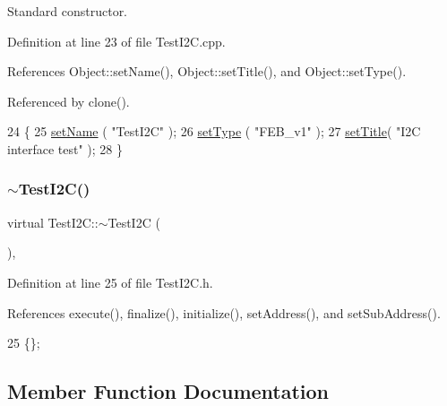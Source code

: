 Standard constructor. 



Definition at line 23 of file Test\+I2\+C.\+cpp.



References Object\+::set\+Name(), Object\+::set\+Title(), and Object\+::set\+Type().



Referenced by clone().


\begin{DoxyCode}
24 \{
25   \hyperlink{classObject_ae30fea75683c2d149b6b6d17c09ecd0c}{setName} ( \textcolor{stringliteral}{"TestI2C"} );
26   \hyperlink{classObject_aae534cc9d982bcb9b99fd505f2e103a5}{setType} ( \textcolor{stringliteral}{"FEB\_v1"} );
27   \hyperlink{classObject_a89557dbbad5bcaa02652f5d7fa35d20f}{setTitle}( \textcolor{stringliteral}{"I2C interface test"} );  
28 \}
\end{DoxyCode}
\mbox{\label{classTestI2C_a60812c524e19a048534d0b110d290a9b}} 
\subsubsection{\texorpdfstring{$\sim$\+Test\+I2\+C()}{~TestI2C()}}
{\footnotesize\ttfamily virtual Test\+I2\+C\+::$\sim$\+Test\+I2C (\begin{DoxyParamCaption}{ }\end{DoxyParamCaption})\hspace{0.3cm}{\ttfamily [inline]}, {\ttfamily [virtual]}}



Definition at line 25 of file Test\+I2\+C.\+h.



References execute(), finalize(), initialize(), set\+Address(), and set\+Sub\+Address().


\begin{DoxyCode}
25 \{\}; 
\end{DoxyCode}


\subsection{Member Function Documentation}
\mbox{\label{classTestI2C_a52b8f5f8203ebea02d0cd73be029de23}} 

